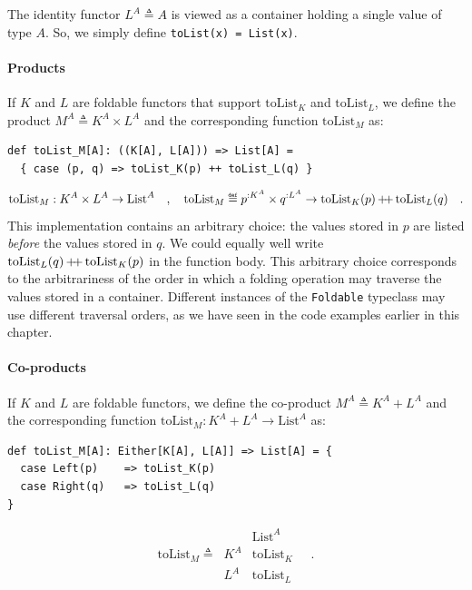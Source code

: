 The identity functor $L^{A}\triangleq A$ is viewed as a container
holding a single value of type $A$. So, we simply define \lstinline!toList(x) = List(x)!.

\paragraph{Products}

If $K$ and $L$ are foldable functors that support $\text{toList}_{K}$
and $\text{toList}_{L}$, we define the product $M^{A}\triangleq K^{A}\times L^{A}$
and the corresponding function $\text{toList}_{M}$ as:
\begin{lstlisting}
def toList_M[A]: ((K[A], L[A])) => List[A] =
  { case (p, q) => toList_K(p) ++ toList_L(q) }
\end{lstlisting}
\[
\text{toList}_{M}:K^{A}\times L^{A}\rightarrow\text{List}^{A}\quad,\quad\text{toList}_{M}\triangleq p^{:K^{A}}\times q^{:L^{A}}\rightarrow\text{toList}_{K}(p)\,\pplus\,\text{toList}_{L}(q)\quad.
\]
This implementation contains an arbitrary choice: the values stored
in $p$ are listed \emph{before} the values stored in $q$. We could
equally well write $\text{toList}_{L}(q)\,{\displaystyle }{+\negmedspace+}\,\text{toList}_{K}(p)$
in the function body. This arbitrary choice corresponds to the arbitrariness
of the order in which a folding operation may traverse the values
stored in a container. Different instances of the \lstinline!Foldable!
typeclass may use different traversal orders, as we have seen in the
code examples earlier in this chapter.

\paragraph{Co-products}

If $K$ and $L$ are foldable functors, we define the co-product $M^{A}\triangleq K^{A}+L^{A}$
and the corresponding function $\text{toList}_{M}:K^{A}+L^{A}\rightarrow\text{List}^{A}$
as:
\begin{lstlisting}
def toList_M[A]: Either[K[A], L[A]] => List[A] = {
  case Left(p)    => toList_K(p)
  case Right(q)   => toList_L(q)
}
\end{lstlisting}
\[
\text{toList}_{M}\triangleq\,\begin{array}{|c||c|}
 & \text{List}^{A}\\
\hline K^{A} & \text{toList}_{K}\\
L^{A} & \text{toList}_{L}
\end{array}\quad.
\]


